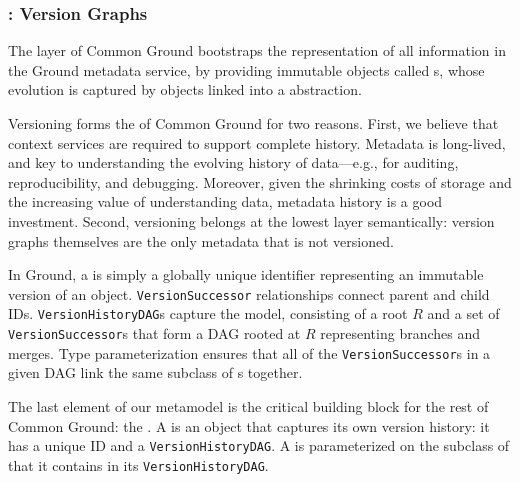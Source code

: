 \documentclass{sig-alternate}
\begin{document}

\subsubsection{\Core: Version Graphs}

The \core layer of Common Ground bootstraps the representation of all information in the Ground metadata service, by providing immutable objects called {\thing}s, whose evolution is captured by {\version} objects linked into a \emph{\versiongraph} abstraction. 

Versioning forms the \core of Common Ground for two reasons.  First, we believe that  context services are required to support complete history. Metadata is long-lived, and key to understanding the evolving history of data---e.g., for auditing, reproducibility, and debugging. Moreover, given the shrinking costs of storage and the increasing value of understanding data, metadata history is a good investment.
Second, versioning belongs at the lowest layer semantically: version graphs themselves are the only metadata that is not versioned.

In Ground, a \version is simply a globally unique identifier representing an immutable version of an object.
\texttt{VersionSuccessor} relationships connect parent and child \version IDs.
\texttt{VersionHistoryDAG}s capture the \versiongraph model, consisting of a root \version $R$ 
and a set of \texttt{VersionSuccessor}s that form a DAG rooted at $R$ 
representing branches and merges.
Type parameterization ensures that all of the \texttt{VersionSuccessor}s in a given DAG link the same subclass of {\version}s together.

The last element of our \core metamodel is the critical building block for
the rest of Common Ground: the \thing. A
\thing is an object that captures its own version history: it has a
unique ID and a \texttt{VersionHistoryDAG}. A \thing is parameterized on the subclass of
\version that it contains in its \texttt{VersionHistoryDAG}.  
\end{document}
